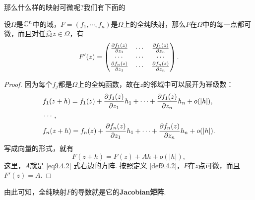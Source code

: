 那么什么样的映射可微呢?我们有下面的
\begin{theorem}\label{thm9.4.3}
  设$\Omega$是$\mathbb C^n$中的域，$F=(f_1,\cdots,f_n)$是$\Omega$上的全纯映射，那么$F$在$\Omega$中的每一点都可微，而且对任意$z\in\Omega$，有
  \begin{equation}\label{eq9.4.2}
    F'(z) = \begin{pmatrix}
    \frac{\partial f_1(z)}{\partial z_1} & \cdots & \frac{\partial f_1(z)}{\partial z_n} \\
    \cdots & \cdots & \cdots \\
    \frac{\partial f_n(z)}{\partial z_1} & \cdots & \frac{\partial f_n(z)}{\partial z_n}
    \end{pmatrix}.
  \end{equation}
\end{theorem}
\begin{proof}
  因为每个$f_j$都是$\Omega$上的全纯函数，故在$z$的邻域中可以展开为幂级数：
  \begin{align*}
    & f_1(z+h) = f_1(z)+\frac{\partial f_1(z)}{\partial z_1}h_1 + \cdots + \frac{\partial f_1(z)}{\partial z_n}h_n+o(|h|),\\
    & \cdots,\\
    & f_n(z+h) = f_n(z)+\frac{\partial f_n(z)}{\partial z_1}h_1 + \cdots + \frac{\partial f_n(z)}{\partial z_n}h_n+o(|h|).
  \end{align*}
  写成向量的形式，就有
  \[
    F(z + h) = F(z) + Ah + o(|h|),
  \]
  这里，$A$就是 \eqref{eq9.4.2} 式右边的方阵. 按照定义 \ref{def9.4.2}，$F$在$z$点可微，而且$F'(z)=A$.
\end{proof}

由此可知，全纯映射$F$的导数就是它的\textbf{Jacobian矩阵}.

